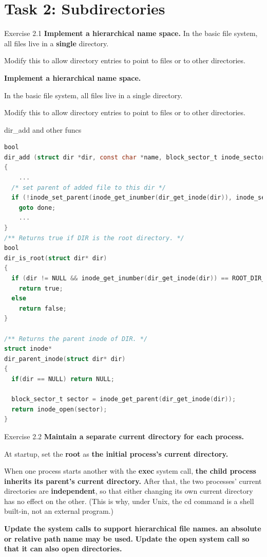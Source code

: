 \documentclass[10pt]{beamer}
\begin{document}
\section{Task 2: Subdirectories}
\begin{frame}[fragile]{Exercise 2.1}
\textbf{Implement a hierarchical name space.
}
In the basic file system, all files live in a \textbf{single} directory.

Modify this to allow directory entries to point to files or to other directories.

\textbf{Implement a hierarchical name space.}

In the basic file system, all files live in a single directory.

Modify this to allow directory entries to point to files or to other directories.
\end{frame}
\begin{frame}[fragile]{dir\_add and other funcs}
\begin{lstlisting}[language=C]
bool
dir_add (struct dir *dir, const char *name, block_sector_t inode_sector)
{
    ...
  /* set parent of added file to this dir */
  if (!inode_set_parent(inode_get_inumber(dir_get_inode(dir)), inode_sector))
    goto done;
    ...
}
/** Returns true if DIR is the root directory. */
bool 
dir_is_root(struct dir* dir)
{
  if (dir != NULL && inode_get_inumber(dir_get_inode(dir)) == ROOT_DIR_SECTOR)
    return true;
  else
    return false;
} 

/** Returns the parent inode of DIR. */
struct inode* 
dir_parent_inode(struct dir* dir)
{
  if(dir == NULL) return NULL;
  
  block_sector_t sector = inode_get_parent(dir_get_inode(dir));
  return inode_open(sector);
}
\end{lstlisting}
\end{frame}
\begin{frame}[fragile]{Exercise 2.2}
\textbf{Maintain a separate current directory for each process.}

At startup, set the \textbf{root} as \textbf{the initial process's current directory.}

When one process starts another with the \textbf{exec} system call,\textbf{ the child process inherits its parent's current directory.} After that, the two processes' current directories are \textbf{independent}, so that either changing its own current directory has no effect on the other. (This is why, under Unix, the cd command is a shell built-in, not an external program.)

\textbf{Update the system calls to support hierarchical file names.}
\textbf{an absolute or relative path name may be used.}
\textbf{Update the open system call so that it can also open directories.}
\end{frame}
\end{document}
